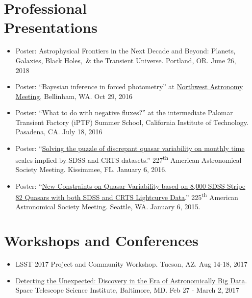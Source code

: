 \documentclass[margin]{res}
\begin{document}
\begin{resume}
\section{Professional\\ Presentations} 
\begin{itemize}  %

\item Poster:    Astrophysical Frontiers in the Next Decade and Beyond: Planets, Galaxies, Black Holes,~\& the Transient Universe. Portland, OR. June 26, 2018 

\item Poster: ``Bayesian inference in forced photometry'' at \href{http://myweb.facstaff.wwu.edu/~davenpj3/nwam2016/}{Northwest Astronomy Meeting}, Bellinham, WA. Oct 29, 2016 

\item Poster: ``What to do with negative fluxes?'' at the intermediate Palomar Transient Factory (iPTF) Summer School, California Institute of Technology.  Pasadena, CA. July 18, 2016

\item Poster: ``\href{http://adsabs.harvard.edu/abs/2016AAS...22724335S}{Solving the puzzle of discrepant quasar variability on monthly time scales implied by SDSS and CRTS datasets}.'' 227\textsuperscript{th} American Astronomical Society Meeting. Kissimmee, FL. January 6, 2016.

\item Poster: ``\href{http://adsabs.harvard.edu/abs/2015AAS...22514464S}{New Constraints on Quasar Variability based on 8,000 SDSS Stripe 82 Quasars with both SDSS and CRTS Lightcurve Data}.'' 225\textsuperscript{th} American Astronomical Society Meeting. Seattle, WA. January 6, 2015.

\end{itemize}


\section{Workshops and Conferences}
\begin{itemize}

    \item LSST 2017 Project and Community Workshop. Tucson, AZ. Aug 14-18, 2017

	\item \href{http://www.cvent.com/events/detecting-the-unexpected-discovery-in-the-era-of-astronomically-big-data/event-summary-0db6808d548b4a9ea6466b43046a1ff5.aspx}{Detecting the Unexpected: Discovery in the Era of Astronomically Big Data}. Space Telescope Science Institute, Baltimore, MD. Feb 27 - March 2, 2017 


\end{itemize}
\end{resume}
\end{document}
